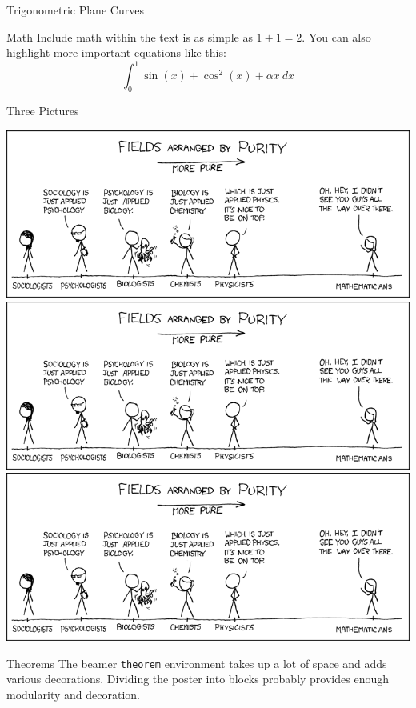 \documentclass{beamer}
\begin{document}
\begin{frame}{}
\begin{columns}[t]
\begin{column}{0.245\linewidth}
\begin{block}{Trigonometric Plane Curves}
\end{block}


\begin{block}{Math}
Include math within the text is as simple as $1+1=2$. You can also
highlight more important equations like this:
$$
\int_0^1\sin(x)+\cos^2(x)+\alpha x\ dx
$$
\end{block}

\begin{block}{Three Pictures}
\vspace{0.5em}

\begin{center}
\includegraphics[width=0.9\columnwidth]{science}\\[1em]
\includegraphics[width=0.9\columnwidth]{science}\\[1em]
\includegraphics[width=0.9\columnwidth]{science}
\end{center}
\end{block}

\begin{block}{Theorems}
The beamer \texttt{theorem} environment takes up a lot of space and
adds various decorations.  Dividing the poster into blocks probably
provides enough modularity and decoration.


\end{block}
\end{column}
\end{columns}
\end{frame}
\end{document}
